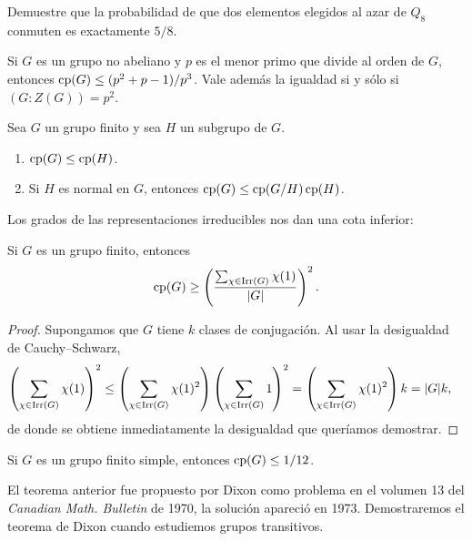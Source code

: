 \begin{exercise}
Demuestre que la probabilidad de que dos elementos elegidos al azar de $Q_8$ 
conmuten es exactamente $5/8$. 
\end{exercise}

\begin{exercise}
Si $G$ es un grupo no abeliano y $p$ es el menor primo que divide al orden de $G$, entonces
$\operatorname{cp}(G)\leq (p^2+p-1)/p^3$. Vale además la igualdad si y sólo si $(G:Z(G))=p^2$. 
\end{exercise}

\begin{exercise}
Sea $G$ un grupo finito y sea $H$ un subgrupo de $G$. 
\begin{enumerate}
    \item $\operatorname{cp}(G)\leq\operatorname{cp}(H)$.
    \item Si $H$ es normal en $G$, entonces $\operatorname{cp}(G)\leq\operatorname{cp}(G/H)\operatorname{cp}(H)$.
\end{enumerate}
\end{exercise}

Los grados de las representaciones irreducibles nos dan una cota inferior:

\begin{proposition}
Si $G$ es un grupo finito, entonces
\[
\operatorname{cp}(G)\geq\left(\frac{\sum_{\chi\in\operatorname{Irr}(G)}\chi(1)}{|G|}\right)^2.
\]
\end{proposition}

\begin{proof}
Supongamos que $G$ tiene $k$ clases de conjugación. 
Al usar la desigualdad de Cauchy--Schwarz, 
\begin{align*}
    \left(\sum_{\chi\in\operatorname{Irr}(G)}\chi(1)\right)^2
    &\leq\left(\sum_{\chi\in\operatorname{Irr}(G)}\chi(1)^2\right)\left(\sum_{\chi\in\operatorname{Irr}(G)}1\right)^2
    =\left(\sum_{\chi\in\operatorname{Irr}(G)}\chi(1)^2\right)k=|G|k,
\end{align*}
de donde se obtiene inmediatamente la desigualdad que queríamos demostrar.
\end{proof}

\begin{theorem}[Dixon]
Si $G$ es un grupo finito simple, entonces $\operatorname{cp}(G)\leq1/12$.
\end{theorem}

El teorema anterior fue propuesto por Dixon como problema en el 
volumen 13 del \emph{Canadian Math. Bulletin} de 1970, 
la solución apareció en 1973. Demostraremos el teorema de Dixon 
cuando estudiemos grupos transitivos.

